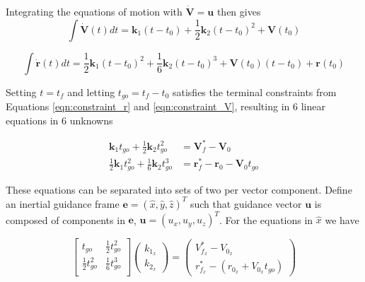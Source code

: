 Integrating the equations of motion with $\boldsymbol{\dot{V}} = \boldsymbol{u}$ then gives
\begin{equation}
\label{eqn:EoM_solve_1}
\int\boldsymbol{\dot{V}}(t) dt  = \boldsymbol{k}_1(t-t_0) + \frac{1}{2}\boldsymbol{k}_2(t-t_0)^2 + \boldsymbol{V}(t_0) 
\end{equation}

\begin{equation}
\int \boldsymbol{\dot{r}}(t)dt = \frac{1}{2} \boldsymbol{k}_1(t-t_0)^2 + \frac{1}{6}\boldsymbol{k}_2(t-t_0)^3 + \boldsymbol{V}(t_0)(t-t_0) + \boldsymbol{r}(t_0) 
\label{eqn:EoM_solve_2}
\end{equation}

Setting $t = t_f$ and letting $t_{go} = t_f - t_0$ satisfies the terminal constraints from Equations \ref{eqn:constraint_r} and \ref{eqn:constraint_V}, resulting in 6 linear equations in 6 unknowns

\begin{align}
\label{eqn:system1}
\boldsymbol{k}_1 t_{go} + \frac{1}{2}\boldsymbol{k}_2 t_{go}^2 &= \boldsymbol{V}_f^* - \boldsymbol{V}_0\\
\label{eqn:system2}
\frac{1}{2}\boldsymbol{k}_1 t_{go}^2 + \frac{1}{6}\boldsymbol{k}_2 t_{go}^3 &= \boldsymbol{r}_f^* - \boldsymbol{r}_0 - \boldsymbol{V}_0t_{go}
\end{align}

These equations can be separated into sets of two per vector component. Define an inertial guidance frame $\boldsymbol{e} = (\hat{x},\hat{y},\hat{z})^T$ such that guidance vector $\boldsymbol{u}$ is composed of components in $\boldsymbol{e}$, $\boldsymbol{u} = (u_{x},u_{y},u_{z})^T$. For the equations in $\hat{x}$ we have

\begin{equation}
  \label{eqn:E_system}
  \begin{bmatrix}
    t_{go} & \frac{1}{2}t_{go}^2 \\
    \frac{1}{2}t_{go}^2 & \frac{1}{6}t_{go}^3 \\
  \end{bmatrix}
 \left(
	\begin{matrix}
	k_{1_x} \\ 
	k_{2_x} 
	\end{matrix}
\right) = 
 \left(
	\begin{matrix}
	V_{f_x}^* - V_{0_x} \\ 
	r_{f_x}^* - (r_{0_x} + V_{0_x}t_{go}) 
	\end{matrix}
\right)
\end{equation}

